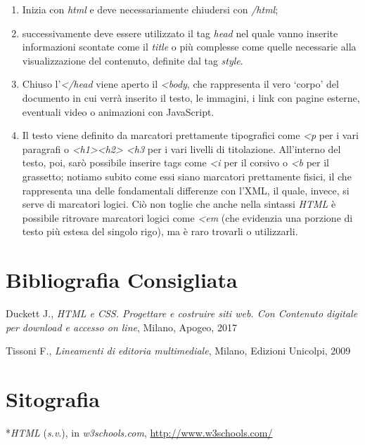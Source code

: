 {\begin{enumerate}
\def\labelenumi{\arabic{enumi}.}
\item
  Inizia con \emph{html} e deve necessariamente
  chiudersi con \emph{/html};
\item
  successivamente deve essere utilizzato il tag
  \emph{head} nel quale vanno inserite
  informazioni scontate come il \emph{title} o
  più complesse come quelle necessarie alla visualizzazione del
  contenuto, definite dal tag \emph{style}.
\item
  Chiuso l'\emph{\textless{}/head} viene aperto il
  \emph{\textless{}body}, che rappresenta il vero `corpo'
  del documento in cui verrà inserito il testo, le immagini, i link con
  pagine esterne, eventuali video o animazioni con JavaScript.
\item
  Il testo viene definito da marcatori prettamente tipografici come
  \emph{\textless{}p} per i vari paragrafi o
  \emph{\textless{}h1\textgreater{}\textless{}h2\textgreater{}
  \textless{}h3} per i vari livelli di titolazione.
  All'interno del testo, poi, sarò possibile inserire tags come
  \emph{\textless{}i} per il corsivo o
  \emph{\textless{}b} per il grassetto; notiamo subito
  come essi siano marcatori prettamente fisici, il che rappresenta una
  delle fondamentali differenze con l'XML, il quale, invece, si serve di
  marcatori logici. Ciò non toglie che anche nella sintassi \emph{HTML}
  è possibile ritrovare marcatori logici come
  \emph{\textless{}em} (che evidenzia una porzione di
  testo più estesa del singolo rigo), ma è raro trovarli o utilizzarli.
\end{enumerate}

\section*{Bibliografia Consigliata}
{\parindent0pt 
Duckett J., \emph{HTML e CSS. Progettare e costruire siti web. Con
Contenuto digitale per download e accesso on line}, Milano, Apogeo, 2017

Tissoni F., \emph{Lineamenti di editoria multimediale}, Milano, Edizioni
Unicolpi, 2009
}

\section*{Sitografia}
{\parindent0pt 
*\emph{HTML} (\emph{s.v}.), in \emph{w3schools.com},
\url{http://www.w3schools.com/}
}


\hrulefill 
 
}
